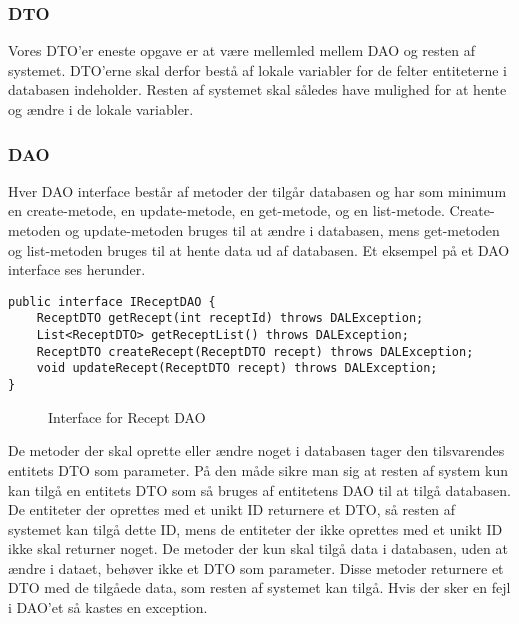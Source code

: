 \documentclass[a4paper]{article}
\begin{document}
\subsubsection{DTO} %

Vores DTO’er eneste opgave er at være mellemled mellem DAO og resten af systemet. DTO’erne skal derfor bestå af lokale variabler for de felter entiteterne i databasen indeholder. Resten af systemet skal således have mulighed for at hente og ændre i de lokale variabler.  


\subsubsection{DAO} %

Hver DAO interface består af metoder der tilgår databasen og har som minimum en create-metode, en update-metode, en get-metode, og en list-metode. Create-metoden og update-metoden bruges til at ændre i databasen, mens get-metoden og list-metoden bruges til at hente data ud af databasen. Et eksempel på et DAO interface ses herunder.

\begin{lstlisting}
public interface IReceptDAO {
	ReceptDTO getRecept(int receptId) throws DALException;
	List<ReceptDTO> getReceptList() throws DALException;
	ReceptDTO createRecept(ReceptDTO recept) throws DALException;
	void updateRecept(ReceptDTO recept) throws DALException;
}
\end{lstlisting}
\begin{figure}[h!]
  \caption{Interface for Recept DAO}
\end{figure}


De metoder der skal oprette eller ændre noget i databasen tager den tilsvarendes entitets DTO som parameter. På den måde sikre man sig at resten af system kun kan tilgå en entitets DTO som så bruges af entitetens DAO til at tilgå databasen. De entiteter der oprettes med et unikt ID returnere et DTO, så resten af systemet kan tilgå dette ID, mens de entiteter der ikke oprettes med et unikt ID ikke skal returner noget.  De metoder der kun skal tilgå data i databasen, uden at ændre i dataet, behøver ikke et DTO som parameter. Disse metoder returnere et DTO med de tilgåede data, som resten af systemet kan tilgå. Hvis der sker en fejl i DAO’et så kastes en exception.


\end{document}
